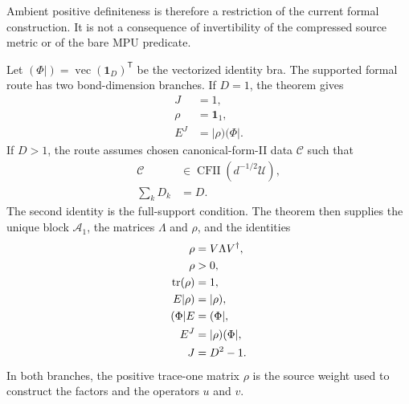 \documentclass{article}
\begin{document}
Ambient positive definiteness is therefore a restriction of the current formal
construction. It is not a consequence of invertibility of the compressed
source metric or of the bare MPU predicate.

Let $(\Phi\rvert)=\operatorname{vec}(\mathbf{1}_D)^{\mathsf T}$ be the
vectorized identity bra. The supported formal route has two bond-dimension
branches. If $D=1$, the theorem
 gives
\begin{align}
    J    & = 1,
    \label{eq:mpu_canonical_form_full_support_fin_one_exponent}    \\
    \rho & = \mathbf{1}_1,
    \label{eq:mpu_canonical_form_full_support_fin_one_fixed_point} \\
    E^J  & = \lvert\rho)(\Phi\rvert.
    \label{eq:mpu_canonical_form_full_support_fin_one_stabilization}
\end{align}
If $D>1$, the route assumes chosen canonical-form-II data $\mathcal C$ such
that
\begin{align}
    \mathcal C
     & \in\operatorname{CFII}(d^{-1/2}\mathcal U),
    \label{eq:mpu_canonical_form_full_support_cfii_membership} \\
    \sum_k D_k
     & = D.
    \label{eq:mpu_canonical_form_full_support_cfii_full_support}
\end{align}
The second identity is the full-support condition. The theorem
then supplies the unique block $\mathcal A_1$, the matrices $\Lambda$ and
$\rho$, and the identities
\begin{align}
    \rho
     & = V\Lambda V^\dagger,
    \label{eq:mpu_canonical_form_full_support_reduced_fixed_point}    \\
    \rho
     & >0,
    \label{eq:mpu_canonical_form_full_support_fixed_point_positive}   \\
    \operatorname{tr}(\rho)
     & =1,
    \label{eq:mpu_canonical_form_full_support_fixed_point_trace}      \\
    E\lvert\rho)
     & =\lvert\rho),
    \label{eq:mpu_canonical_form_full_support_right_fixed_vector}     \\
    (\Phi\rvert E
     & =(\Phi\rvert,
    \label{eq:mpu_canonical_form_full_support_left_fixed_vector}      \\
    E^J
     & =\lvert\rho)(\Phi\rvert,
    \label{eq:mpu_canonical_form_full_support_transfer_stabilization} \\
    J
     & =D^2-1.
    \label{eq:mpu_canonical_form_full_support_stabilization_exponent}
\end{align}
In both branches, the positive trace-one matrix $\rho$ is the source weight
used to construct the factors and the operators $u$ and $v$.
\end{document}
